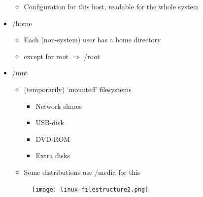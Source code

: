 \documentclass{article}
\begin{document}
\begin{itemize}
\begin{itemize}
        \item Configuration for this host, readable for the whole system
    \end{itemize}
    \item /home
    \begin{itemize}
        \item Each (non-system) user has a home directory
        \item except for root $\Rightarrow$ /root
    \end{itemize}
    \item /mnt
    \begin{itemize}
        \item (temporarily) `mounted' filesystems
        \begin{itemize}
            \item Network shares
            \item USB-disk
            \item DVD-ROM
            \item Extra disks
        \end{itemize}
        \item Some distributions use /media for this
    \end{itemize}
    \begin{figure}[H]
        \centering
        \texttt{[image: linux-filestructure2.png]}
        \caption{}
    \end{figure}
    

\end{itemize}
\end{document}
